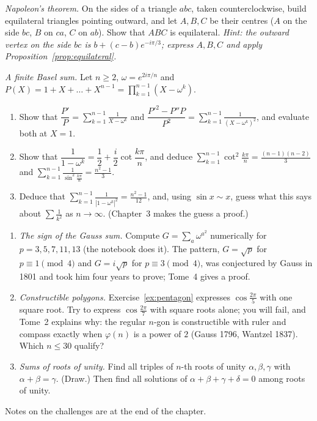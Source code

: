 \begin{exercise}[$\star\star\star$]\label{ex:napoleon}
\emph{Napoleon's theorem.} On the sides of a triangle $abc$, taken counterclockwise, build equilateral triangles pointing outward, and let $A,B,C$ be their
centres ($A$ on the side $bc$, $B$ on $ca$, $C$ on $ab$). Show that $ABC$ is equilateral. \emph{Hint: the outward vertex on the side $bc$ is $b+(c-b)e^{-i\pi/3}$; express $A,B,C$ and apply Proposition~\ref{prop:equilateral}.}
\end{exercise}

\begin{exercise}[$\star\star\star$]\label{ex:cotsum}
\emph{A finite Basel sum.} Let $n\ge2$, $\omega=e^{2i\pi/n}$ and $P(X)=1+X+\dots+X^{n-1}=\prod_{k=1}^{n-1}(X-\omega^k)$.
\begin{enumerate}[label=(\alph*)]
\item Show that $\dfrac{P'}{P}=\displaystyle\sum_{k=1}^{n-1}\frac1{X-\omega^k}$ and $\dfrac{P'^2-P''P}{P^2}=\displaystyle\sum_{k=1}^{n-1}\frac1{(X-\omega^k)^2}$, and evaluate both at $X=1$.
\item Show that $\dfrac1{1-\omega^k}=\dfrac12+\dfrac i2\cot\dfrac{k\pi}n$, and deduce $\displaystyle\sum_{k=1}^{n-1}\cot^2\frac{k\pi}n=\frac{(n-1)(n-2)}3$ and $\displaystyle\sum_{k=1}^{n-1}\frac1{\sin^2\frac{k\pi}n}=\frac{n^2-1}3$.
\item Deduce that $\displaystyle\sum_{k=1}^{n-1}\frac1{|1-\omega^k|^2}=\frac{n^2-1}{12}$, and, using $\sin x\sim x$, guess what this says about $\sum\frac1{k^2}$ as $n\to\infty$. (Chapter~3 makes the guess a proof.)
\end{enumerate}
\end{exercise}

\begin{challenge}
\begin{enumerate}[label=(\arabic*)]
\item \emph{The sign of the Gauss sum.} Compute $G=\sum_a\omega^{a^2}$ numerically for $p=3,5,7,11,13$ (the notebook does it). The pattern, $G=\sqrt p$ for $p\equiv1\pmod4$ and $G=i\sqrt p$ for $p\equiv3\pmod4$, was conjectured by Gauss in 1801 and took him four years to prove; Tome~4 gives a proof.
\item \emph{Constructible polygons.} Exercise~\ref{ex:pentagon} expresses $\cos\frac{2\pi}5$ with one square root. Try to express $\cos\frac{2\pi}7$ with square roots alone; you will fail, and Tome~2 explains why: the regular $n$-gon is constructible with ruler and compass exactly when $\varphi(n)$ is a power of $2$ (Gauss 1796, Wantzel 1837). Which $n\le30$ qualify?
\item \emph{Sums of roots of unity.} Find all triples of $n$-th roots of unity $\alpha,\beta,\gamma$ with $\alpha+\beta=\gamma$. (Draw.) Then find all solutions of $\alpha+\beta+\gamma+\delta=0$ among roots of unity.
\end{enumerate}
Notes on the challenges are at the end of the chapter.
\end{challenge}

